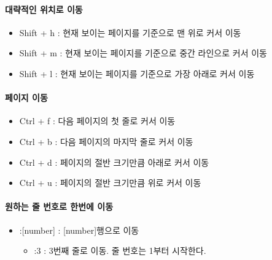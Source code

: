 \paragraph{대략적인 위치로 이동}
\begin{itemize}[$\bullet$]
    \item Shift + h : 현재 보이는 페이지를 기준으로 맨 위로 커서 이동
    \item Shift + m : 현재 보이는 페이지를 기준으로 중간 라인으로 커서 이동
    \item Shift + l : 현재 보이는 페이지를 기준으로 가장 아래로 커서 이동
\end{itemize}
\paragraph{페이지 이동}
\begin{itemize}[$\bullet$]
    \item Ctrl + f : 다음 페이지의 첫 줄로 커서 이동
    \item Ctrl + b : 다음 페이지의 마지막 줄로 커서 이동
    \item Ctrl + d : 페이지의 절반 크기만큼 아래로 커서 이동
    \item Ctrl + u : 페이지의 절반 크기만큼 위로 커서 이동
\end{itemize}
\paragraph{원하는 줄 번호로 한번에 이동}
\begin{itemize}[$\bullet$]
    \item :[number] : [number]행으로 이동
        \begin{itemize}[Ex)]
            \item :3 : 3번째 줄로 이동. 줄 번호는 1부터 시작한다.
        \end{itemize}
\end{itemize}
